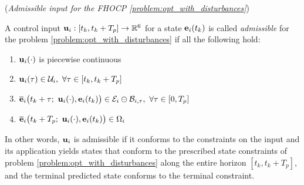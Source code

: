 \begin{bw_box}
  \begin{definition} (\textit{Admissible input for the FHOCP
    \eqref{problem:opt_with_disturbances}})
  \label{definition:admissible_input_with_disturbance}

  A control input $\bm{\mathbf{u}}_i : [t_k, t_k + T_p] \to \mathbb{R}^6$ for a state
  $\bm{\mathbf{e}}_i(t_k)$ is called \textit{admissible} for the problem
  \eqref{problem:opt_with_disturbances} if all the following hold:

  \begin{enumerate}
    \item $\bm{\mathbf{u}}_i(\cdot)$ is piecewise continuous
    \item $\vect{u}_i(\tau) \in \mathcal{U}_i,\ \forall \tau \in [t_k, t_k + T_p]$
    \item $\overline{\vect{e}}_i\big(t_k + \tau;\ \vect{u}_i(\cdot), \vect{e}_i(t_k)\big) \in \mathcal{E}_i \ominus \mathcal{B}_{i,\tau},\ \forall \tau \in [0, T_p]$
    \item $\overline{\vect{e}}_i\big(t_k + T_p;\ \vect{u}_i(\cdot), \vect{e}_i(t_k)\big) \in \Omega_i$
  \end{enumerate}

  In other words, $\bm{\mathbf{u}}_i$ is admissible if it conforms to the constraints
  on the input and its application yields states that conform to the
  prescribed state constraints of problem \eqref{problem:opt_with_disturbances}
  along the entire horizon $[t_k, t_k + T_p]$, and the terminal predicted
  state conforms to the terminal constraint.

\end{definition}
\end{bw_box}
